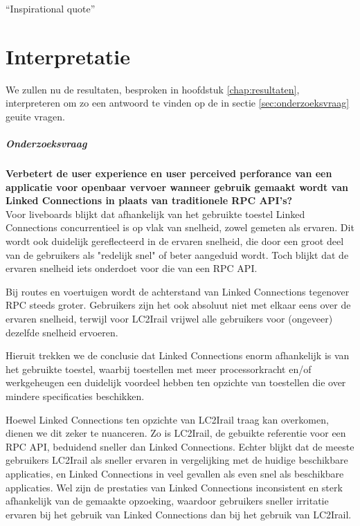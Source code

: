 \begin{savequote}[0.55\linewidth]
	``Inspirational quote''
\end{savequote}

\chapter{Interpretatie}
\label{chap:interpretatie}

We zullen nu de resultaten, besproken in hoofdstuk \ref{chap:resultaten}, interpreteren om zo een antwoord te vinden op de in sectie \ref{sec:onderzoeksvraag} geuite vragen.

\paragraph{Onderzoeksvraag}  \textbf{Verbetert de user experience en user perceived perforance van een applicatie voor openbaar vervoer wanneer gebruik gemaakt wordt van Linked Connections in plaats van traditionele RPC API's?}\\

Voor liveboards blijkt dat afhankelijk van het gebruikte toestel Linked Connections concurrentieel is op vlak van snelheid, zowel gemeten als ervaren. Dit wordt ook duidelijk gereflecteerd in de ervaren snelheid, die door een groot deel van de gebruikers als "redelijk snel" of beter aangeduid wordt. Toch blijkt dat de ervaren snelheid iets onderdoet voor die van een RPC API.

Bij routes en voertuigen wordt de achterstand van Linked Connections tegenover RPC steeds groter. Gebruikers zijn het ook absoluut niet met elkaar eens over de ervaren snelheid, terwijl voor LC2Irail vrijwel alle gebruikers voor (ongeveer) dezelfde snelheid ervoeren.

Hieruit trekken we de conclusie dat Linked Connections enorm afhankelijk is van het gebruikte toestel,  waarbij toestellen met meer processorkracht en/of werkgeheugen een duidelijk voordeel hebben ten opzichte van toestellen die over mindere specificaties beschikken.

Hoewel Linked Connections ten opzichte van LC2Irail traag kan overkomen, dienen we dit zeker te nuanceren. Zo is LC2Irail, de gebuikte referentie voor een RPC API, beduidend sneller dan Linked Connections. Echter blijkt dat de meeste gebruikers LC2Irail als sneller ervaren in vergelijking met de huidige beschikbare applicaties, en Linked Connections in veel gevallen als even snel als beschikbare applicaties. Wel zijn de prestaties van Linked Connections inconsistent en sterk afhankelijk van de gemaakte opzoeking, waardoor gebruikers sneller irritatie ervaren bij het gebruik van Linked Connections dan bij het gebruik van LC2Irail.

